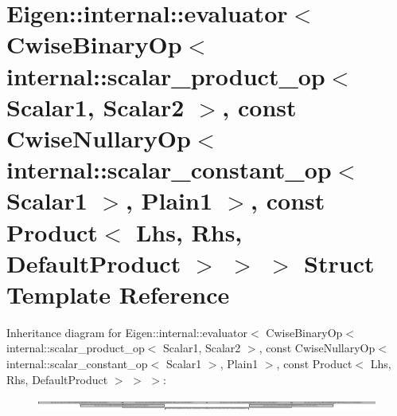 \hypertarget{struct_eigen_1_1internal_1_1evaluator_3_01_cwise_binary_op_3_01internal_1_1scalar__product__op_321f22566d2663743c7f9d1c3e4e03f69}{}\section{Eigen\+:\+:internal\+:\+:evaluator$<$ Cwise\+Binary\+Op$<$ internal\+:\+:scalar\+\_\+product\+\_\+op$<$ Scalar1, Scalar2 $>$, const Cwise\+Nullary\+Op$<$ internal\+:\+:scalar\+\_\+constant\+\_\+op$<$ Scalar1 $>$, Plain1 $>$, const Product$<$ Lhs, Rhs, Default\+Product $>$ $>$ $>$ Struct Template Reference}
\label{struct_eigen_1_1internal_1_1evaluator_3_01_cwise_binary_op_3_01internal_1_1scalar__product__op_321f22566d2663743c7f9d1c3e4e03f69}
Inheritance diagram for Eigen\+:\+:internal\+:\+:evaluator$<$ Cwise\+Binary\+Op$<$ internal\+:\+:scalar\+\_\+product\+\_\+op$<$ Scalar1, Scalar2 $>$, const Cwise\+Nullary\+Op$<$ internal\+:\+:scalar\+\_\+constant\+\_\+op$<$ Scalar1 $>$, Plain1 $>$, const Product$<$ Lhs, Rhs, Default\+Product $>$ $>$ $>$\+:\begin{figure}[H]
\begin{center}
\leavevmode
\includegraphics[height=0.334661cm]{struct_eigen_1_1internal_1_1evaluator_3_01_cwise_binary_op_3_01internal_1_1scalar__product__op_321f22566d2663743c7f9d1c3e4e03f69}
\end{center}
\end{figure}
